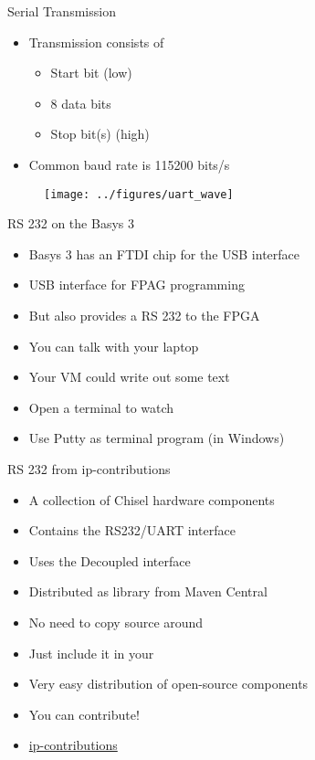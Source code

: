 \begin{frame}[fragile]{Serial Transmission}
\begin{itemize}
\item Transmission consists of
\begin{itemize}
\item Start bit (low)
\item 8 data bits
\item Stop bit(s) (high)
\end{itemize}
\item Common baud rate is 115200 bits/s
\end{itemize}
\begin{figure}
  \texttt{[image: ../figures/uart\_wave]}
\end{figure}
\end{frame}


\begin{frame}[fragile]{RS 232 on the Basys 3}
\begin{itemize}
\item Basys 3 has an FTDI chip for the USB interface
\item USB interface for FPAG programming
\item But also provides a RS 232 to the FPGA
\item You can talk with your laptop
\item Your VM could write out some text
\item Open a terminal to watch
\item Use Putty as terminal program (in Windows)
\end{itemize}
\end{frame}

\begin{frame}[fragile]{RS 232 from ip-contributions}
\begin{itemize}
\item A collection of Chisel hardware components
\item Contains the RS232/UART interface
\item Uses the Decoupled interface
\item Distributed as library from Maven Central
\item No need to copy source around
\item Just include it in your 
\item Very easy distribution of open-source components
\item You can contribute!
\item \href{https://github.com/freechipsproject/ip-contributions}{ip-contributions}
\end{itemize}
\end{frame}


